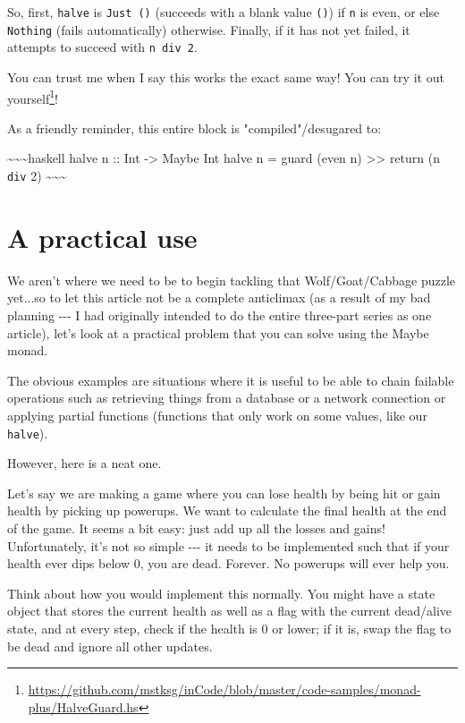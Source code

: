 \documentclass[]{article}
\renewcommand{\href}[2]{#2\footnote{\url{#1}}}
\begin{document}
So, first, \texttt{halve} is \texttt{Just\ ()} (succeeds with a blank value
\texttt{()}) if \texttt{n} is even, or else \texttt{Nothing} (fails
automatically) otherwise. Finally, if it has not yet failed, it attempts to
succeed with \texttt{n\ \textasciigrave{}div\textasciigrave{}\ 2}.

You can trust me when I say this works the exact same way! You can
\href{https://github.com/mstksg/inCode/blob/master/code-samples/monad-plus/HalveGuard.hs}{try
it out yourself}!

As a friendly reminder, this entire block is "compiled"/desugared to:

\textasciitilde{}\textasciitilde{}\textasciitilde{}haskell halve n :: Int
-\textgreater{} Maybe Int halve n = guard (even n) \textgreater{}\textgreater{}
return (n \texttt{div} 2) \textasciitilde{}\textasciitilde{}\textasciitilde{}

\section{A practical use}

We aren't where we need to be to begin tackling that Wolf/Goat/Cabbage puzzle
yet...so to let this article not be a complete anticlimax (as a result of my bad
planning -\/-\/- I had originally intended to do the entire three-part series as
one article), let's look at a practical problem that you can solve using the
Maybe monad.

The obvious examples are situations where it is useful to be able to chain
failable operations such as retrieving things from a database or a network
connection or applying partial functions (functions that only work on some
values, like our \texttt{halve}).

However, here is a neat one.

Let's say we are making a game where you can lose health by being hit or gain
health by picking up powerups. We want to calculate the final health at the end
of the game. It seems a bit easy: just add up all the losses and gains!
Unfortunately, it's not so simple -\/-\/- it needs to be implemented such that
if your health ever dips below 0, you are dead. Forever. No powerups will ever
help you.

Think about how you would implement this normally. You might have a state object
that stores the current health as well as a flag with the current dead/alive
state, and at every step, check if the health is 0 or lower; if it is, swap the
flag to be dead and ignore all other updates.
\end{document}

